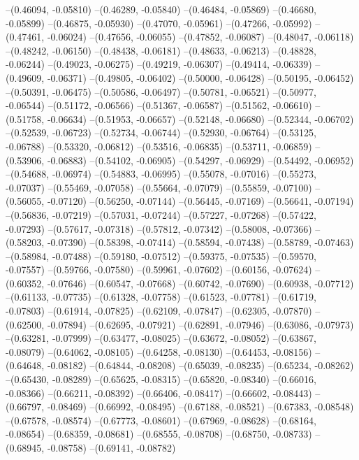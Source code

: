 --(0.46094, -0.05810)
--(0.46289, -0.05840)
--(0.46484, -0.05869)
--(0.46680, -0.05899)
--(0.46875, -0.05930)
--(0.47070, -0.05961)
--(0.47266, -0.05992)
--(0.47461, -0.06024)
--(0.47656, -0.06055)
--(0.47852, -0.06087)
--(0.48047, -0.06118)
--(0.48242, -0.06150)
--(0.48438, -0.06181)
--(0.48633, -0.06213)
--(0.48828, -0.06244)
--(0.49023, -0.06275)
--(0.49219, -0.06307)
--(0.49414, -0.06339)
--(0.49609, -0.06371)
--(0.49805, -0.06402)
--(0.50000, -0.06428)
--(0.50195, -0.06452)
--(0.50391, -0.06475)
--(0.50586, -0.06497)
--(0.50781, -0.06521)
--(0.50977, -0.06544)
--(0.51172, -0.06566)
--(0.51367, -0.06587)
--(0.51562, -0.06610)
--(0.51758, -0.06634)
--(0.51953, -0.06657)
--(0.52148, -0.06680)
--(0.52344, -0.06702)
--(0.52539, -0.06723)
--(0.52734, -0.06744)
--(0.52930, -0.06764)
--(0.53125, -0.06788)
--(0.53320, -0.06812)
--(0.53516, -0.06835)
--(0.53711, -0.06859)
--(0.53906, -0.06883)
--(0.54102, -0.06905)
--(0.54297, -0.06929)
--(0.54492, -0.06952)
--(0.54688, -0.06974)
--(0.54883, -0.06995)
--(0.55078, -0.07016)
--(0.55273, -0.07037)
--(0.55469, -0.07058)
--(0.55664, -0.07079)
--(0.55859, -0.07100)
--(0.56055, -0.07120)
--(0.56250, -0.07144)
--(0.56445, -0.07169)
--(0.56641, -0.07194)
--(0.56836, -0.07219)
--(0.57031, -0.07244)
--(0.57227, -0.07268)
--(0.57422, -0.07293)
--(0.57617, -0.07318)
--(0.57812, -0.07342)
--(0.58008, -0.07366)
--(0.58203, -0.07390)
--(0.58398, -0.07414)
--(0.58594, -0.07438)
--(0.58789, -0.07463)
--(0.58984, -0.07488)
--(0.59180, -0.07512)
--(0.59375, -0.07535)
--(0.59570, -0.07557)
--(0.59766, -0.07580)
--(0.59961, -0.07602)
--(0.60156, -0.07624)
--(0.60352, -0.07646)
--(0.60547, -0.07668)
--(0.60742, -0.07690)
--(0.60938, -0.07712)
--(0.61133, -0.07735)
--(0.61328, -0.07758)
--(0.61523, -0.07781)
--(0.61719, -0.07803)
--(0.61914, -0.07825)
--(0.62109, -0.07847)
--(0.62305, -0.07870)
--(0.62500, -0.07894)
--(0.62695, -0.07921)
--(0.62891, -0.07946)
--(0.63086, -0.07973)
--(0.63281, -0.07999)
--(0.63477, -0.08025)
--(0.63672, -0.08052)
--(0.63867, -0.08079)
--(0.64062, -0.08105)
--(0.64258, -0.08130)
--(0.64453, -0.08156)
--(0.64648, -0.08182)
--(0.64844, -0.08208)
--(0.65039, -0.08235)
--(0.65234, -0.08262)
--(0.65430, -0.08289)
--(0.65625, -0.08315)
--(0.65820, -0.08340)
--(0.66016, -0.08366)
--(0.66211, -0.08392)
--(0.66406, -0.08417)
--(0.66602, -0.08443)
--(0.66797, -0.08469)
--(0.66992, -0.08495)
--(0.67188, -0.08521)
--(0.67383, -0.08548)
--(0.67578, -0.08574)
--(0.67773, -0.08601)
--(0.67969, -0.08628)
--(0.68164, -0.08654)
--(0.68359, -0.08681)
--(0.68555, -0.08708)
--(0.68750, -0.08733)
--(0.68945, -0.08758)
--(0.69141, -0.08782)
